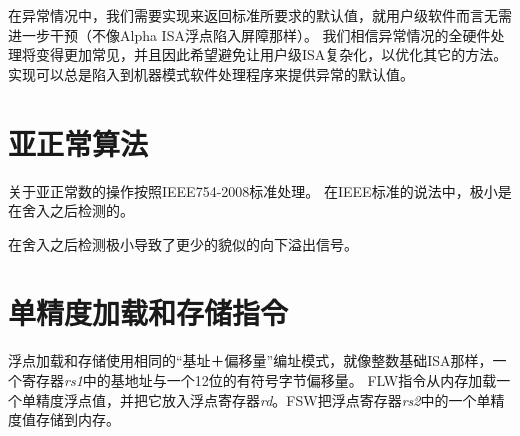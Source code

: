 \begin{commentary}
  在异常情况中，我们需要实现来返回标准所要求的默认值，就用户级软件而言无需进一步干预（不像Alpha ISA浮点陷入屏障那样）。
  我们相信异常情况的全硬件处理将变得更加常见，并且因此希望避免让用户级ISA复杂化，以优化其它的方法。
  实现可以总是陷入到机器模式软件处理程序来提供异常的默认值。
\end{commentary}

\section{亚正常算法}

关于亚正常数的操作按照IEEE754-2008标准处理。
在IEEE标准的说法中，极小是在舍入之后检测的。

\begin{commentary}
  在舍入之后检测极小导致了更少的貌似的向下溢出信号。
\end{commentary}

\section{单精度加载和存储指令}

浮点加载和存储使用相同的“基址＋偏移量”编址模式，就像整数基础ISA那样，一个寄存器{\em rs1}中的基地址与一个12位的有符号字节偏移量。
FLW指令从内存加载一个单精度浮点值，并把它放入浮点寄存器{\em rd}。FSW把浮点寄存器{\em rs2}中的一个单精度值存储到内存。

